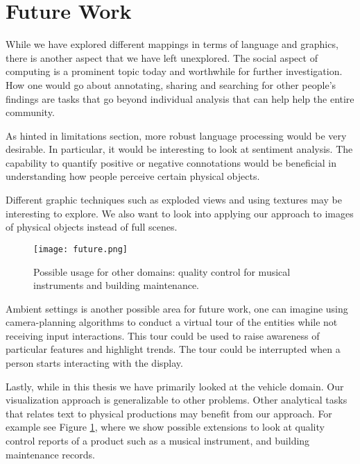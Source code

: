  

\section{Future Work}
While we have explored different mappings in terms of language and graphics,
there is another aspect that we have left unexplored. The social aspect of
computing is a prominent topic today and worthwhile for further investigation.
How one would go about annotating, sharing and searching for other people's
findings are tasks that go beyond individual analysis that can help help the
entire community.


As hinted in limitations section, more robust language processing would be very
desirable. In particular, it would be interesting to look at sentiment analysis.
The capability to quantify positive or negative connotations would be beneficial
in understanding how people perceive certain physical objects. 

Different graphic techniques such as exploded views and using textures may be interesting
to explore. We also want to look into applying our approach to \twod images of physical 
objects instead of full \threed scenes.

	\begin{figure}
	 \centering  
	 \texttt{[image: future.png]}  
	 \caption[Other Uses]{Possible usage for other domains: quality control for
	 musical instruments and building maintenance.}
	 \label{figure:future}
	\end{figure}

Ambient settings is another possible area for future work, one can imagine using
camera-planning algorithms to conduct a virtual tour of the entities while not
receiving input interactions. This tour could be used to raise awareness of
particular features and highlight trends. The tour could be interrupted when a
person starts interacting with the display.

Lastly, while in this thesis we have primarily looked at the vehicle domain. Our
visualization approach is generalizable to other problems. Other analytical
tasks that relates text to physical productions may benefit from our approach. For
example see Figure \ref{figure:future}, where we show possible extensions
to look at quality control reports of a product such as a musical instrument,
and building maintenance records.


